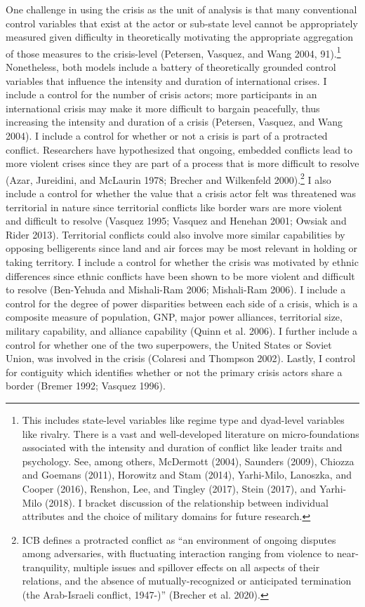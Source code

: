 \documentclass[
]{article}
\begin{document}
One challenge in using the crisis as the unit of analysis is that many conventional control variables that exist at the actor or sub-state level cannot be appropriately measured given difficulty in theoretically motivating the appropriate aggregation of those measures to the crisis-level (Petersen, Vasquez, and Wang 2004, 91).\footnote{This includes state-level variables like regime type and dyad-level variables like rivalry. There is a vast and well-developed literature on micro-foundations associated with the intensity and duration of conflict like leader traits and psychology. See, among others, McDermott (2004), Saunders (2009), Chiozza and Goemans (2011), Horowitz and Stam (2014), Yarhi-Milo, Lanoszka, and Cooper (2016), Renshon, Lee, and Tingley (2017), Stein (2017), and Yarhi-Milo (2018). I bracket discussion of the relationship between individual attributes and the choice of military domains for future research.} Nonetheless, both models include a battery of theoretically grounded control variables that influence the intensity and duration of international crises. I include a control for the number of crisis actors; more participants in an international crisis may make it more difficult to bargain peacefully, thus increasing the intensity and duration of a crisis (Petersen, Vasquez, and Wang 2004). I include a control for whether or not a crisis is part of a protracted conflict. Researchers have hypothesized that ongoing, embedded conflicts lead to more violent crises since they are part of a process that is more difficult to resolve (Azar, Jureidini, and McLaurin 1978; Brecher and Wilkenfeld 2000).\footnote{ICB defines a protracted conflict as ``an environment of ongoing disputes among adversaries, with fluctuating interaction ranging from violence to near-tranquility, multiple issues and spillover effects on all aspects of their relations, and the absence of mutually-recognized or anticipated termination (the Arab-Israeli conflict, 1947-)'' (Brecher et al. 2020).} I also include a control for whether the value that a crisis actor felt was threatened was territorial in nature since territorial conflicts like border wars are more violent and difficult to resolve (Vasquez 1995; Vasquez and Henehan 2001; Owsiak and Rider 2013). Territorial conflicts could also involve more similar capabilities by opposing belligerents since land and air forces may be most relevant in holding or taking territory. I include a control for whether the crisis was motivated by ethnic differences since ethnic conflicts have been shown to be more violent and difficult to resolve (Ben-Yehuda and Mishali-Ram 2006; Mishali-Ram 2006). I include a control for the degree of power disparities between each side of a crisis, which is a composite measure of population, GNP, major power alliances, territorial size, military capability, and alliance capability (Quinn et al. 2006). I further include a control for whether one of the two superpowers, the United States or Soviet Union, was involved in the crisis (Colaresi and Thompson 2002). Lastly, I control for contiguity which identifies whether or not the primary crisis actors share a border (Bremer 1992; Vasquez 1996).
\end{document}
